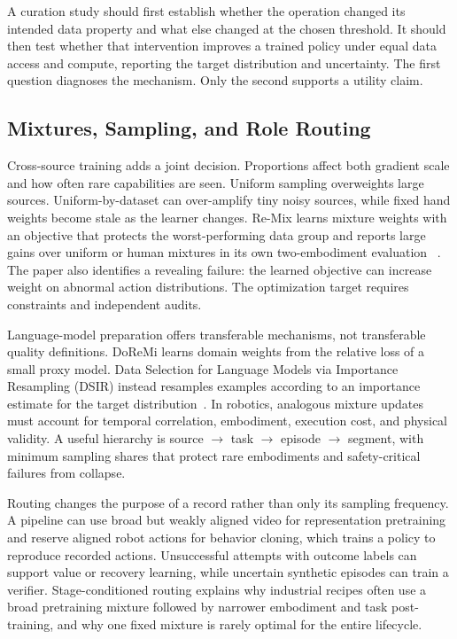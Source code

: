 A curation study should first establish whether the operation changed its intended data property and what else changed at the chosen threshold.
It should then test whether that intervention improves a trained policy under equal data access and compute, reporting the target distribution and uncertainty.
The first question diagnoses the mechanism.
Only the second supports a utility claim.

\subsection{Mixtures, Sampling, and Role Routing}

Cross-source training adds a joint decision.
Proportions affect both gradient scale and how often rare capabilities are seen.
Uniform sampling overweights large sources.
Uniform-by-dataset can over-amplify tiny noisy sources, while fixed hand weights become stale as the learner changes.
Re-Mix learns mixture weights with an objective that protects the worst-performing data group and reports large gains over uniform or human mixtures in its own two-embodiment evaluation ~\cite{hejna2024re_2408_14037}.
The paper also identifies a revealing failure: the learned objective can increase weight on abnormal action distributions.
The optimization target requires constraints and independent audits.

Language-model preparation offers transferable mechanisms, not transferable quality definitions.
DoReMi learns domain weights from the relative loss of a small proxy model.
Data Selection for Language Models via Importance Resampling (DSIR) instead resamples examples according to an importance estimate for the target distribution~\cite{xie2023doremi_2305_10429,xie2023data_2302_03169}.
In robotics, analogous mixture updates must account for temporal correlation, embodiment, execution cost, and physical validity.
A useful hierarchy is source $\rightarrow$ task $\rightarrow$ episode $\rightarrow$ segment, with minimum sampling shares that protect rare embodiments and safety-critical failures from collapse.

Routing changes the purpose of a record rather than only its sampling frequency.
A pipeline can use broad but weakly aligned video for representation pretraining and reserve aligned robot actions for behavior cloning, which trains a policy to reproduce recorded actions.
Unsuccessful attempts with outcome labels can support value or recovery learning, while uncertain synthetic episodes can train a verifier.
Stage-conditioned routing explains why industrial recipes often use a broad pretraining mixture followed by narrower embodiment and task post-training, and why one fixed mixture is rarely optimal for the entire lifecycle.

